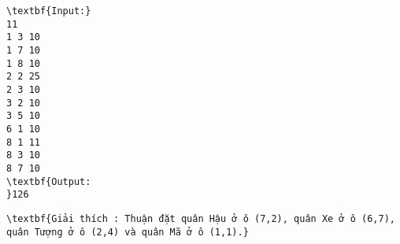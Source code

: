 \begin{verbatim}
\textbf{Input:}
11
1 3 10
1 7 10
1 8 10
2 2 25
2 3 10
3 2 10
3 5 10
6 1 10
8 1 11
8 3 10
8 7 10
\textbf{Output:
}126\end{verbatim}
\begin{verbatim}
\textbf{Giải thích : Thuận đặt quân Hậu ở ô (7,2), quân Xe ở ô (6,7), quân Tượng ở ô (2,4) và quân Mã ở ô (1,1).}\end{verbatim}